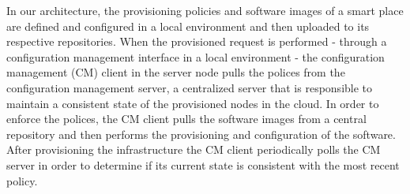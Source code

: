 In our architecture, the provisioning policies and software images of a smart place are defined and
configured in a local environment and then uploaded to its respective repositories. When the provisioned
request is performed - through a configuration management interface in a local environment - the
configuration management (CM) client in the server node pulls the polices from the configuration
management server, a centralized server that is responsible to maintain a consistent state of the
provisioned nodes in the cloud. In order to enforce the polices, the CM client pulls the software
images from a central repository and then performs the provisioning and configuration of the software.
After provisioning the infrastructure the CM client periodically polls the CM server in order to
determine if its current state is consistent with the most recent policy.
